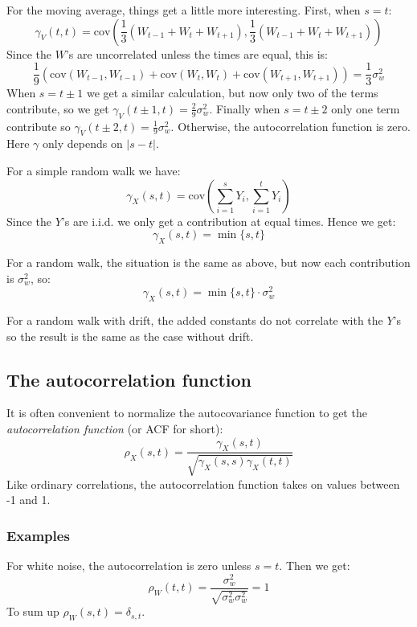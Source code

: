 \documentclass[12pt, a4paper]{article}
\numberwithin{equation}{section}
\begin{document}
For the moving average, things get a little more interesting. First, when $s=t$:
\begin{equation}
\gamma_V(t,t)=\textrm{cov}\left(\frac{1}{3}(W_{t-1}+W_t+W_{t+1}),\frac{1}{3}(W_{t-1}+W_t+W_{t+1})\right)
\end{equation}
Since the $W$'s are uncorrelated unless the times are equal, this is:
\begin{equation}
\frac{1}{9}(\textrm{cov}(W_{t-1},W_{t-1})+\textrm{cov}(W_t,W_t)+\textrm{cov}(W_{t+1},W_{t+1}))=\frac{1}{3}\sigma_w^2
\end{equation}
When $s=t\pm 1$ we get a similar calculation, but now only two of the terms contribute, so we get $\gamma_V(t\pm 1,t)=\frac{2}{9}\sigma_w^2$. Finally when $s=t\pm 2$ only one term contribute so $\gamma_V(t\pm 2,t)=\frac{1}{9}\sigma_w^2$. Otherwise, the autocorrelation function is zero. Here $\gamma$ only depends on $|s-t|$.

For a simple random walk we have:
\begin{equation}
\gamma_X(s,t)=\textrm{cov}\left(\sum_{i=1}^s Y_i,\sum_{i=1}^t Y_i\right)
\end{equation}
Since the $Y$'s are i.i.d. we only get a contribution at equal times. Hence we get:
\begin{equation}
\gamma_X(s,t)=\min\{s,t\}
\end{equation}

For a random walk, the situation is the same as above, but now each contribution is $\sigma_w^2$, so:
\begin{equation}
\gamma_X(s,t)=\min\{s,t\}\cdot\sigma_w^2
\end{equation}

For a random walk with drift, the added constants do not correlate with the $Y$'s so the result is the same as the case without drift.

\subsection{The autocorrelation function}
It is often convenient to normalize the autocovariance function to get the \textit{autocorrelation function} (or ACF for short):
\begin{equation}
\rho_X(s,t)=\frac{\gamma_X(s,t)}{\sqrt{\gamma_X(s,s)\gamma_X(t,t)}}
\end{equation}
Like ordinary correlations, the autocorrelation function takes on values between -1 and 1.

\subsubsection{Examples}
For white noise, the autocorrelation is zero unless $s=t$. Then we get:
\begin{equation}
\rho_W(t,t)=\frac{\sigma_w^2}{\sqrt{\sigma_w^2\sigma_w^2}}=1
\end{equation}
To sum up $\rho_W(s,t)=\delta_{s,t}$.
\end{document}

